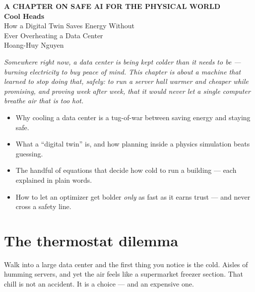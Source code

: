 \documentclass[11pt]{report}
\begin{document}
\pagestyle{plain}

\begin{center}
{\small\bfseries\color{kirule}\MakeUppercase{A chapter on safe AI for the physical world}}\\[10pt]
{\huge\bfseries Cool Heads}\\[6pt]
{\Large How a Digital Twin Saves Energy Without\\[2pt] Ever Overheating a Data Center}\\[14pt]
{\large Hoang-Huy Nguyen}\\[6pt]
\end{center}

\vspace{4pt}
\noindent\textit{Somewhere right now, a data center is being kept colder than it needs to be ---
burning electricity to buy peace of mind. This chapter is about a machine that learned to stop
doing that, safely: to run a server hall warmer and cheaper while promising, and proving week
after week, that it would never let a single computer breathe air that is too hot.}

\begin{tcolorbox}[colback=wlbg,colframe=wlrule,boxrule=0.8pt,arc=3pt,
  left=9pt,right=9pt,top=6pt,bottom=6pt,fonttitle=\bfseries,coltitle=white,
  colbacktitle=wlrule,title=What you'll learn]
\begin{itemize}[leftmargin=1.2em,nosep,itemsep=2pt]
  \item Why cooling a data center is a tug-of-war between saving energy and staying safe.
  \item What a ``digital twin'' is, and how planning inside a physics simulation beats guessing.
  \item The handful of equations that decide how cold to run a building --- each explained in plain words.
  \item How to let an optimizer get bolder \emph{only} as fast as it earns trust --- and never cross a safety line.
\end{itemize}
\end{tcolorbox}

\vspace{6pt}
\section{The thermostat dilemma}

Walk into a large data center and the first thing you notice is the cold. Aisles of humming servers, and yet the air feels like a supermarket freezer section. That chill is not an accident. It is a choice --- and an expensive one.
\end{document}

